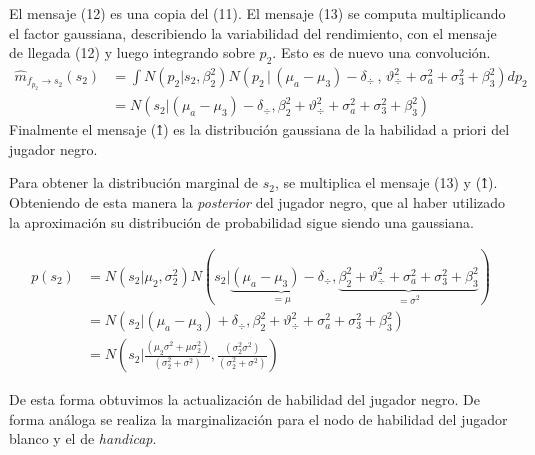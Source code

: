 \documentclass[11pt,twoside,spanish]{report} %
\begin{document}
El mensaje (12) es una copia del (11).
El mensaje (13) se computa multiplicando el factor gaussiana, describiendo la variabilidad del rendimiento, con el mensaje de llegada (12) y luego integrando sobre $p_2$.
Esto es de nuevo una convoluci\'on.
\begin{equation}
\begin{split}
\widehat{m}_{f_{p_2} \rightarrow s_2}(s_2) &= \int  N(p_2| s_2, \beta_2^2)  N( p_2 \,|\,  (\mu_a - \mu_3) - \delta_{\div}  \,,\,\vartheta_{\div}^2 + \sigma_a^2 + \sigma_3^2 + \beta_3^2)  dp_2 \\
&=  N( s_2|(\mu_a - \mu_3) - \delta_{\div}  ,\beta_2^2+ \vartheta_{\div}^2 + \sigma_a^2 + \sigma_3^2 + \beta_3^2)
\end{split}
\end{equation}
Finalmente el mensaje (\^{1}) es la distribuci\'on gaussiana de la habilidad a priori del jugador negro.

Para obtener la distribuci\'on marginal de $s_2$, se multiplica el mensaje (13) y (\^{1}).
Obteniendo de esta manera la \textit{posterior} del jugador negro, que al haber utilizado la aproximaci\'on su distribuci\'on de probabilidad sigue siendo una gaussiana.

\begin{equation}
\begin{split}
p(s_2) &= N( s_2|\mu_2,\sigma_2^2)  N( s_2| \underbrace{(\mu_a - \mu_3) - \delta_{\div}}_{=\mu}  , \underbrace{\beta_2^2+ \vartheta_{\div}^2 + \sigma_a^2 + \sigma_3^2 + \beta_3^2}_{=\sigma^2}) \\
&=  N( s_2|(\mu_a - \mu_3) + \delta_{\div}  ,\beta_2^2+ \vartheta_{\div}^2 + \sigma_a^2 + \sigma_3^2 + \beta_3^2) \\
&=  N\left(s_2|\frac{(\mu_2\sigma^2+\mu\sigma_2^2)}{(\sigma_2^2+\sigma^2)}, \frac{(\sigma_2^2\sigma^2)}{(\sigma_2^2+\sigma^2)}\right)
\end{split}
\end{equation}

De esta forma obtuvimos la actualizaci\'on de habilidad del jugador negro.
De forma an\'aloga se realiza la marginalizaci\'on para el nodo de habilidad del jugador blanco y el de \textit{handicap}.
\end{document}
